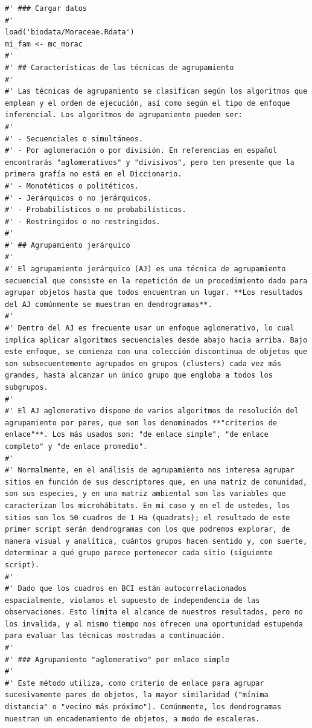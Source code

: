 \documentclass[11pt,]{article}
\begin{document}
\begin{verbatim}
#' ### Cargar datos
#' 
load('biodata/Moraceae.Rdata')
mi_fam <- mc_morac
#'
#' ## Características de las técnicas de agrupamiento
#' 
#' Las técnicas de agrupamiento se clasifican según los algoritmos que emplean y el orden de ejecución, así como según el tipo de enfoque inferencial. Los algoritmos de agrupamiento pueden ser:
#' 
#' - Secuenciales o simultáneos.
#' - Por aglomeración o por división. En referencias en español encontrarás "aglomerativos" y "divisivos", pero ten presente que la primera grafía no está en el Diccionario.
#' - Monotéticos o politéticos.
#' - Jerárquicos o no jerárquicos.
#' - Probabilísticos o no probabilísticos.
#' - Restringidos o no restringidos.
#' 
#' ## Agrupamiento jerárquico
#' 
#' El agrupamiento jerárquico (AJ) es una técnica de agrupamiento secuencial que consiste en la repetición de un procedimiento dado para agrupar objetos hasta que todos encuentran un lugar. **Los resultados del AJ comúnmente se muestran en dendrogramas**.
#' 
#' Dentro del AJ es frecuente usar un enfoque aglomerativo, lo cual implica aplicar algoritmos secuenciales desde abajo hacia arriba. Bajo este enfoque, se comienza con una colección discontinua de objetos que son subsecuentemente agrupados en grupos (clusters) cada vez más grandes, hasta alcanzar un único grupo que engloba a todos los subgrupos.
#' 
#' El AJ aglomerativo dispone de varios algoritmos de resolución del agrupamiento por pares, que son los denominados **"criterios de enlace"**. Los más usados son: "de enlace simple", "de enlace completo" y "de enlace promedio".
#' 
#' Normalmente, en el análisis de agrupamiento nos interesa agrupar sitios en función de sus descriptores que, en una matriz de comunidad, son sus especies, y en una matriz ambiental son las variables que caracterizan los microhábitats. En mi caso y en el de ustedes, los sitios son los 50 cuadros de 1 Ha (quadrats); el resultado de este primer script serán dendrogramas con los que podremos explorar, de manera visual y analítica, cuántos grupos hacen sentido y, con suerte, determinar a qué grupo parece pertenecer cada sitio (siguiente script).
#' 
#' Dado que los cuadros en BCI están autocorrelacionados espacialmente, violamos el supuesto de independencia de las observaciones. Esto limita el alcance de nuestros resultados, pero no los invalida, y al mismo tiempo nos ofrecen una oportunidad estupenda para evaluar las técnicas mostradas a continuación.
#' 
#' ### Agrupamiento "aglomerativo" por enlace simple
#' 
#' Este método utiliza, como criterio de enlace para agrupar sucesivamente pares de objetos, la mayor similaridad ("mínima distancia" o "vecino más próximo"). Comúnmente, los dendrogramas muestran un encadenamiento de objetos, a modo de escaleras.

\end{verbatim}
\end{document}
